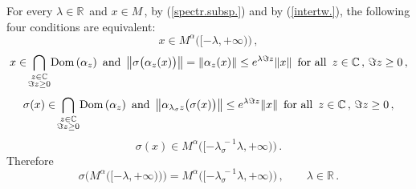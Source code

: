 \documentclass[reqno]{amsart}
\theoremstyle{definition}
\theoremstyle{remark}
\numberwithin{equation}{section}
\theoremstyle{plain}
\begin{document}
For every $\lambda\in\mathbb R\,$ and $x\in M\,$,
by (\ref{spectr.subsp.}) and by (\ref{intertw.}), the following
four conditions are equivalent:
\begin{equation*}
x\in M^\alpha \big( [-\lambda ,+\infty )\big)\, ,
\end{equation*}
\begin{equation*}
x\in \!\bigcap_{\substack{{z\in\mathbb C}\\{\Im z\geq 0}}}\!
{\rm Dom}\, (\alpha_z )\,\text{ and }\,
\big\|\sigma\big( \alpha_z (x) \big)\big\| = \|\alpha_z (x)\|
\leq e^{\lambda \Im z}\| x\|\,\text{ for all }\, z\in\mathbb C
\, ,\,\Im z\geq 0\, ,
\end{equation*}
\begin{equation*}
\sigma (x)\in \!\bigcap_{\substack{{z\in\mathbb C}\\{\Im z\geq 0}}}
\! {\rm Dom}\, (\alpha_z )\,\text{ and }\,
\big\|\alpha_{\lambda_\sigma z}\big( \sigma (x) \big)\big\|\leq
e^{\lambda \Im z}\| x\|\,\text{ for all }\, z\in\mathbb C\, ,\,
\Im z\geq 0\, ,
\end{equation*}
\begin{equation*}
\sigma (x)\in M^\alpha \big( [-\lambda_\sigma^{\, -1}\lambda ,
+\infty )\big)\, .
\end{equation*}
Therefore
\begin{equation}\label{subsp.}
\sigma \big( M^\alpha \big( [-\lambda ,+\infty )\big)\big) =
M^\alpha \big( [-\lambda_\sigma^{\, -1}\lambda ,+\infty )\big)\, ,
\qquad \lambda\in\mathbb R\, .
\end{equation}
\end{document}
